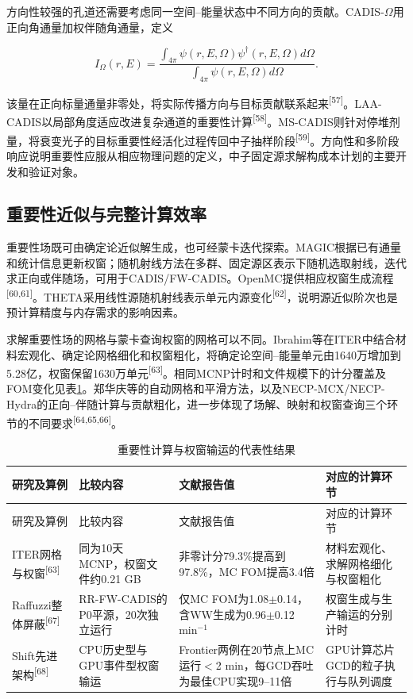 \documentclass[UTF8, zihao=-4, fontset=none, a4paper]{ctexart}
\newcommand{\upcite}[1]{\textsuperscript{[#1]}}
\begin{document}
方向性较强的孔道还需要考虑同一空间--能量状态中不同方向的贡献。CADIS-$\Omega$用正向角通量加权伴随角通量，定义

\begin{equation}
I_{\Omega}(r,E) = \frac{\int_{4\pi}^{}{\psi(r,E,\Omega)\psi^{\dagger}(r,E,\Omega)d\Omega}}{\int_{4\pi}^{}{\psi(r,E,\Omega)d\Omega}}.
\label{eq:8}
\end{equation}

该量在正向标量通量非零处，将实际传播方向与目标贡献联系起来\upcite{57}。LAA-CADIS以局部角度适应改进复杂通道的重要性计算\upcite{58}。MS-CADIS则针对停堆剂量，将衰变光子的目标重要性经活化过程传回中子抽样阶段\upcite{59}。方向性和多阶段响应说明重要性应服从相应物理问题的定义，中子固定源求解构成本计划的主要开发和验证对象。

\subsection{重要性近似与完整计算效率}

重要性场既可由确定论近似解生成，也可经蒙卡迭代探索。MAGIC根据已有通量和统计信息更新权窗；随机射线方法在多群、固定源区表示下随机选取射线，迭代求正向或伴随场，可用于CADIS/FW-CADIS。OpenMC提供相应权窗生成流程\upcite{60,61}。THETA采用线性源随机射线表示单元内源变化\upcite{62}，说明源近似阶次也是预计算精度与内存需求的影响因素。

求解重要性场的网格与蒙卡查询权窗的网格可以不同。Ibrahim等在ITER中结合材料宏观化、确定论网格细化和权窗粗化，将确定论空间--能量单元由1640万增加到5.28亿，权窗保留1630万单元\upcite{63}。相同MCNP计时和文件规模下的计分覆盖及FOM变化见表\ref{tab:4}。郑华庆等的自动网格和平滑方法，以及NECP-MCX/NECP-Hydra的正向--伴随计算与贡献粗化，进一步体现了场解、映射和权窗查询三个环节的不同要求\upcite{64,65,66}。

\begin{longtable}{@{}>{\raggedright\arraybackslash}p{}>{\raggedright\arraybackslash}p{}>{\raggedright\arraybackslash}p{}>{\raggedright\arraybackslash}p{}@{}}
\caption{重要性计算与权窗输运的代表性结果}\label{tab:4}\\
\toprule
研究及算例 & 比较内容 & 文献报告值 & 对应的计算环节 \\
\midrule
\endfirsthead
\toprule
研究及算例 & 比较内容 & 文献报告值 & 对应的计算环节 \\
\midrule
\endhead
\bottomrule
\endlastfoot
ITER网格与权窗\upcite{63} & 同为10天MCNP，权窗文件约0.21 GB & 非零计分79.3\%提高到97.8\%，MC FOM提高3.4倍 & 材料宏观化、求解网格细化与权窗粗化 \\
Raffuzzi整体屏蔽\upcite{67} & RR-FW-CADIS的P0平源，20次独立运行 & 仅MC FOM为1.08$\pm$0.14，含WW生成为0.96$\pm$0.12 min$^{-1}$ & 权窗生成与生产输运的分别计时 \\
Shift先进架构\upcite{68} & CPU历史型与GPU事件型权窗输运 & Frontier两例在20节点上MC运行$<$2 min，每GCD吞吐为最佳CPU实现9--11倍 & GPU计算芯片GCD的粒子执行与队列调度 \\
\end{longtable}
\end{document}
